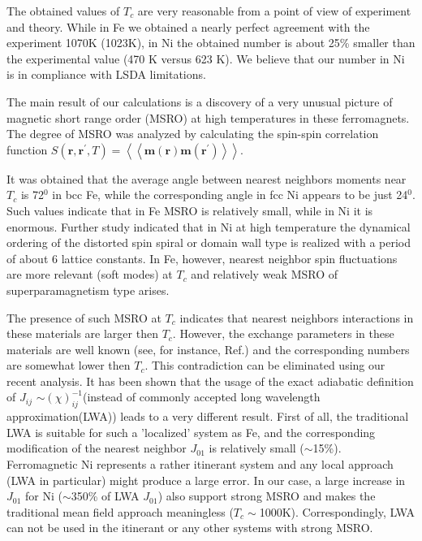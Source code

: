 \documentclass[aps,preprint,twocolumn,10pt]{revtex4}%
\begin{document}
The obtained values of $T_{c}$ are very reasonable from a point of view of
experiment and theory. While in Fe we obtained a nearly perfect agreement with
the experiment 1070K (1023K), in Ni the obtained number is about 25\% smaller
than the experimental value (470 K versus 623 K). We believe that our number
in Ni is in compliance with LSDA limitations.

The main result of our calculations is a discovery of a very unusual picture
of magnetic short range order (MSRO) at high temperatures in these
ferromagnets. The degree of MSRO was analyzed by calculating the spin-spin
correlation function $S(\mathbf{r},\mathbf{r}^{\prime},T)=\left\langle
\left\langle \mathbf{m}\left(  \mathbf{r}\right)  \mathbf{m}\left(
\mathbf{r}^{\prime}\right)  \right\rangle \right\rangle .$

It was obtained that the average angle between nearest neighbors moments near
$T_{c}$ is 72$^{0}$ in bcc Fe, while the corresponding angle in fcc Ni appears
to be just 24$^{0}$. Such values indicate that in Fe MSRO is relatively small,
while in Ni it is enormous. Further study indicated that in Ni at high
temperature the dynamical ordering of the distorted spin spiral or domain wall
type is realized with a period of about 6 lattice constants. In Fe, however,
nearest neighbor spin fluctuations are more relevant (soft modes) at $T_{c}$
and relatively weak MSRO of superparamagnetism type arises.

The presence of such MSRO at $T_{c}$ indicates that nearest neighbors
interactions in these materials are larger then $T_{c}$. However, the exchange
parameters in these materials are well known (see, for instance,
Ref.\cite{REV}) and the corresponding numbers are somewhat lower then $T_{c}$.
This contradiction can be eliminated using our recent analysis\cite{JMMM}. It
has been shown that the usage of the exact adiabatic definition of $J_{ij}$
$\sim\left(  \chi\right)  _{ij}^{-1}$(instead of commonly accepted long
wavelength approximation(LWA)) leads to a very different result. First of all,
the traditional LWA is suitable for such a 'localized' system as Fe, and the
corresponding modification of the nearest neighbor $J_{01}$ is relatively
small ($\sim$15\%). Ferromagnetic Ni represents a rather itinerant system and
any local approach (LWA in particular) might produce a large error. In our
case, a large increase in $J_{01}$ for Ni ($\sim$350\% of LWA $J_{01}$) also
support strong MSRO and makes the traditional mean field approach meaningless
($T_{c}\sim$1000K). Correspondingly, LWA can not be used in the itinerant or
any other systems with strong MSRO.
\end{document}
